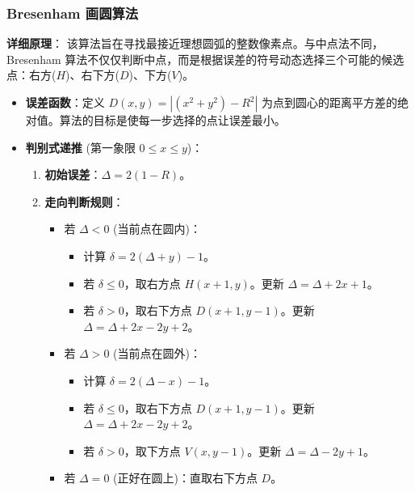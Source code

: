 \documentclass[UTF8]{ctexart}
\begin{document}
\subsubsection{Bresenham 画圆算法}
\textbf{详细原理}：
该算法旨在寻找最接近理想圆弧的整数像素点。与中点法不同，Bresenham 算法不仅仅判断中点，而是根据误差的符号动态选择三个可能的候选点：右方($H$)、右下方($D$)、下方($V$)。
\begin{itemize}
    \item \textbf{误差函数}：定义 $D(x,y) = |(x^2 + y^2) - R^2|$ 为点到圆心的距离平方差的绝对值。算法的目标是使每一步选择的点让误差最小。
    \item \textbf{判别式递推} (第一象限 $0 \le x \le y$)：
        \begin{enumerate}
            \item \textbf{初始误差}：$\Delta = 2(1-R)$。
            \item \textbf{走向判断规则}：
                \begin{itemize}
                    \item 若 $\Delta < 0$ (当前点在圆内)：
                        \begin{itemize}
                            \item 计算 $\delta = 2(\Delta + y) - 1$。
                            \item 若 $\delta \le 0$，取右方点 $H(x+1, y)$。更新 $\Delta = \Delta + 2x + 1$。
                            \item 若 $\delta > 0$，取右下方点 $D(x+1, y-1)$。更新 $\Delta = \Delta + 2x - 2y + 2$。
                        \end{itemize}
                    \item 若 $\Delta > 0$ (当前点在圆外)：
                        \begin{itemize}
                            \item 计算 $\delta = 2(\Delta - x) - 1$。
                            \item 若 $\delta \le 0$，取右下方点 $D(x+1, y-1)$。更新 $\Delta = \Delta + 2x - 2y + 2$。
                            \item 若 $\delta > 0$，取下方点 $V(x, y-1)$。更新 $\Delta = \Delta - 2y + 1$。
                        \end{itemize}
                    \item 若 $\Delta = 0$ (正好在圆上)：直取右下方点 $D$。
                \end{itemize}
        \end{enumerate}

\end{itemize}
\end{document}
